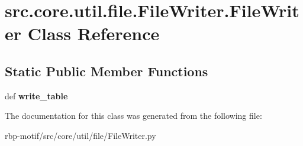 \hypertarget{classsrc_1_1core_1_1util_1_1file_1_1FileWriter_1_1FileWriter}{\section{src.\-core.\-util.\-file.\-File\-Writer.\-File\-Writer Class Reference}
\label{classsrc_1_1core_1_1util_1_1file_1_1FileWriter_1_1FileWriter}
}
\subsection*{Static Public Member Functions}
\begin{DoxyCompactItemize}
\item 
\hypertarget{classsrc_1_1core_1_1util_1_1file_1_1FileWriter_1_1FileWriter_a9c4671980fd495b37bc1efdb9af1876c}{def {\bfseries write\-\_\-table}}\label{classsrc_1_1core_1_1util_1_1file_1_1FileWriter_1_1FileWriter_a9c4671980fd495b37bc1efdb9af1876c}

\end{DoxyCompactItemize}


The documentation for this class was generated from the following file\-:\begin{DoxyCompactItemize}
\item 
rbp-\/motif/src/core/util/file/File\-Writer.\-py\end{DoxyCompactItemize}
